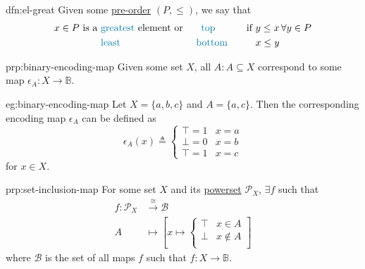 \begin{dfn}{dfn:el-great}
    Given some \hyperref[dfn:pre-order]{pre-order} \( (P, \leq) \), we say that
    \begin{alignat*}{3}
        x \in P \text{ is a }
        &\text{\textcolor{dfn-color}{greatest}} \text{ element or }
        &\text{\textcolor{dfn-color}{top}} \hspace{1cm} \text{ if }
        &y \leq x \, \forall y \in P \\
        &\text{\textcolor{dfn-color}{least}} &\text{\textcolor{dfn-color}{bottom}} \hspace{1cm}
        &x \leq y
    \end{alignat*}
\end{dfn}

\begin{prp}{prp:binary-encoding-map}
    Given some set \( X \), all \( A : A \subseteq X \) correspond to some map \( \epsilon_{A} : X \to \mathbb{B} \).
\end{prp}
\newpage
\begin{eg}{eg:binary-encoding-map}
    Let \( X = \{ a, b, c \} \) and \( A = \{ a, c \} \).
    Then the corresponding encoding map \( \epsilon_{A} \) can be defined as
    \[
        \epsilon_{A}(x) \triangleq
        \begin{cases}
            \top = 1 & x = a \\
            \bot = 0 & x = b \\
            \top = 1 & x = c
        \end{cases}
    \]
    for \( x \in X \).
\end{eg}

\begin{prp}{prp:set-inclusion-map}
    For some set \( X \) and its \hyperref[eg:powerset]{powerset} \( \mathcal{P}_{X} \), \( \exists f \) such that
    \begin{align*}
        f : \mathcal{P}_{X} &\xrightarrow{\cong} \mathcal{B} \\
        A &\mapsto
        \left [
            x \mapsto
            \begin{cases}
                \top & x \in A \\
                \bot & x \notin A \\
            \end{cases}
        \right]
    \end{align*}
    where \( \mathcal{B} \) is the set of all maps \( f \) such that \( f : X \to \mathbb{B} \).
\end{prp}

